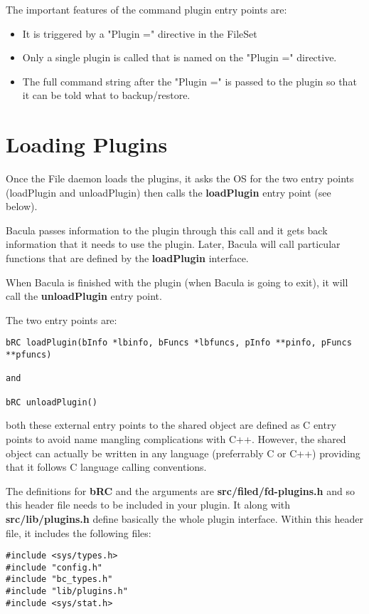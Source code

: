 The important features of the command plugin entry points are:
\begin{itemize}
 \item It is triggered by a "Plugin =" directive in the FileSet
 \item Only a single plugin is called that is named on the "Plugin =" directive.
 \item The full command string after the "Plugin =" is passed to the plugin
    so that it can be told what to backup/restore.
\end{itemize}


\section{Loading Plugins}
Once the File daemon loads the plugins, it asks the OS for the
two entry points (loadPlugin and unloadPlugin) then calls the
{\bf loadPlugin} entry point (see below).

Bacula passes information to the plugin through this call and it gets
back information that it needs to use the plugin.  Later, Bacula
 will call particular functions that are defined by the
{\bf loadPlugin} interface.  

When Bacula is finished with the plugin 
(when Bacula is going to exit), it will call the {\bf unloadPlugin}
entry point.

The two entry points are:

\begin{verbatim}
bRC loadPlugin(bInfo *lbinfo, bFuncs *lbfuncs, pInfo **pinfo, pFuncs **pfuncs)

and

bRC unloadPlugin()
\end{verbatim}

both these external entry points to the shared object are defined as C entry
points to avoid name mangling complications with C++.  However, the shared
object can actually be written in any language (preferrably C or C++) providing
that it follows C language calling conventions.

The definitions for {\bf bRC} and the arguments are {\bf
src/filed/fd-plugins.h} and so this header file needs to be included in
your plugin.  It along with {\bf src/lib/plugins.h} define basically the whole
plugin interface.  Within this header file, it includes the following
files:

\begin{verbatim}
#include <sys/types.h>
#include "config.h"
#include "bc_types.h"
#include "lib/plugins.h"
#include <sys/stat.h>
\end{verbatim}

